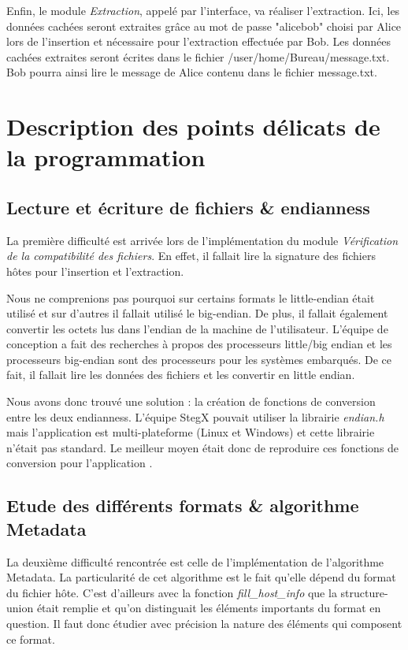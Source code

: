 \documentclass[11pt]{article}
\begin{document}
Enfin, le module \textit{Extraction}, appelé par l'interface, va réaliser 
l'extraction. Ici, les données cachées seront extraites grâce au mot de passe 
"alicebob" choisi par Alice lors de l'insertion et nécessaire pour l'extraction 
effectuée par Bob. 
Les données cachées extraites seront écrites dans le fichier
/user/home/Bureau/message.txt. Bob pourra ainsi lire le message de Alice 
contenu dans le fichier message.txt. 

\section{Description des points délicats de la programmation}

\subsection{Lecture et écriture de fichiers \& endianness}

La première difficulté est arrivée lors de l'implémentation du module 
\textit{Vérification de la compatibilité des fichiers}. En effet, il fallait 
lire la signature des fichiers hôtes pour l'insertion et l'extraction. 

Nous ne comprenions pas pourquoi sur certains formats le little-endian 
était utilisé et sur d'autres il fallait utilisé le big-endian. 
De plus, il fallait également convertir les octets lus dans l'endian de la 
machine de l'utilisateur. L'équipe de conception a fait des recherches à 
propos des processeurs little/big endian et les processeurs big-endian sont 
des processeurs pour les systèmes embarqués. De ce fait, il fallait lire 
les données des fichiers et les convertir en little endian. 

Nous avons donc trouvé une solution : la création de fonctions de 
conversion entre les deux endianness. L'équipe StegX pouvait utiliser la 
librairie \textit{endian.h} mais l'application est multi-plateforme (Linux 
et Windows) et cette librairie n'était pas standard. Le meilleur moyen était 
donc de reproduire ces fonctions de conversion pour l'application 
\label{endian}. 

\subsection{Etude des différents formats \& algorithme Metadata}

La deuxième difficulté rencontrée est celle de l'implémentation de 
l'algorithme Metadata. La particularité de cet algorithme est le fait 
qu'elle dépend du format du fichier hôte. C'est d'ailleurs avec la fonction 
\textit{fill\_host\_info} que la structure-union était remplie et qu'on 
distinguait les éléments importants du format en question.  
Il faut donc étudier avec précision la nature des éléments qui composent
ce format.  
\end{document}
